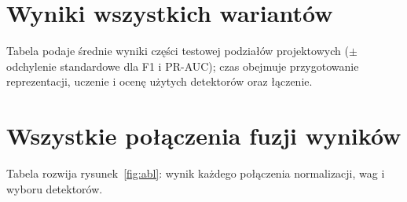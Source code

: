 \documentclass[11pt,a4paper]{article}
\begin{document}
\appendix
\FloatBarrier
\section{Wyniki wszystkich wariantów}
\label{app:full}

Tabela podaje średnie wyniki części testowej podziałów projektowych ($\pm$
odchylenie standardowe dla F1 i PR-AUC); czas obejmuje przygotowanie
reprezentacji, uczenie i ocenę użytych detektorów oraz łączenie.

{\footnotesize\setlength{\tabcolsep}{3pt}}

\FloatBarrier
\section{Wszystkie połączenia fuzji wyników}
\label{app:abl}

Tabela rozwija rysunek~\ref{fig:abl}: wynik każdego połączenia
normalizacji, wag i wyboru detektorów.

\begin{table}[H]
  \centering\small
  \caption{Fuzja wyników (normalizacja dopasowana na walidacji): średnia
  PR-AUC i F1 z 4 zbiorów danych, zmiana względem najlepszego pojedynczego
  detektora; Wygrane -- na ilu zbiorach danych fuzja ma wyższą PR-AUC.}
  \label{tab:abl}
\end{table}
\end{document}
